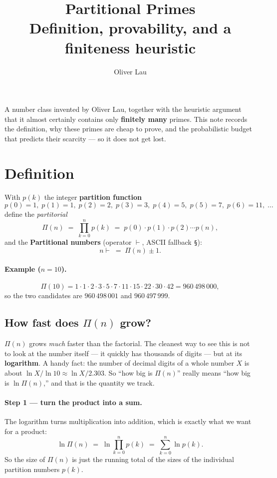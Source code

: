 \documentclass[11pt,a4paper]{article}
\title{\textbf{Partitional Primes}\\[0.3em]
       \large Definition, provability, and a finiteness heuristic}
\author{Oliver Lau}
\date{}
\newcommand{\partop}{\vdash}
\newcommand{\Part}{\Pi}                 %
\begin{document}
\maketitle

\noindent
A number class invented by Oliver Lau, together with the heuristic argument that
it almost certainly contains only \textbf{finitely many} primes. This note
records the definition, why these primes are cheap to prove, and the
probabilistic budget that predicts their scarcity --- so it does not get lost.

\section{Definition}

With $p(k)$ the integer \textbf{partition function}
\[
  p(0)=1,\; p(1)=1,\; p(2)=2,\; p(3)=3,\; p(4)=5,\; p(5)=7,\; p(6)=11,\;\dots
\]
define the \emph{partitorial}
\[
  \Part(n) \;=\; \prod_{k=0}^{n} p(k) \;=\; p(0)\cdot p(1)\cdot p(2)\cdots p(n),
\]
and the \textbf{Partitional numbers} (operator $\partop$, ASCII fallback \texttt{\S}):
\[
  n\partop \;=\; \Part(n) \pm 1 .
\]

\paragraph{Example ($n=10$).}
\[
  \Part(10)=1\cdot1\cdot2\cdot3\cdot5\cdot7\cdot11\cdot15\cdot22\cdot30\cdot42
          = 960\,498\,000,
\]
so the two candidates are $960\,498\,001$ and $960\,497\,999$.

\subsection*{How fast does \texorpdfstring{$\Part(n)$}{Pi(n)} grow?}

$\Part(n)$ grows \emph{much} faster than the factorial. The cleanest way to see
this is not to look at the number itself --- it quickly has thousands of digits
--- but at its \textbf{logarithm}. A handy fact: the number of decimal digits of
a whole number $X$ is about $\ln X / \ln 10 \approx \ln X / 2.303$. So ``how big
is $\Part(n)$'' really means ``how big is $\ln\Part(n)$,'' and that is the
quantity we track.

\paragraph{Step 1 --- turn the product into a sum.}
The logarithm turns multiplication into addition, which is exactly what we want
for a product:
\[
  \ln\Part(n) \;=\; \ln\!\prod_{k=0}^{n} p(k)
             \;=\; \sum_{k=0}^{n} \ln p(k).
\]
So the size of $\Part(n)$ is just the running total of the sizes of the
individual partition numbers $p(k)$.
\end{document}
